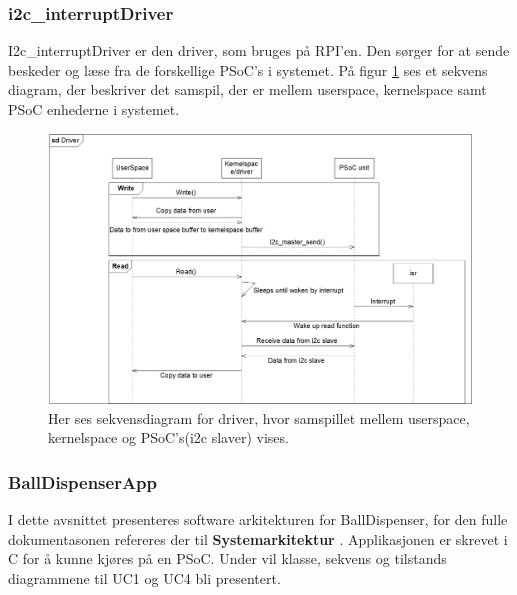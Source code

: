 \documentclass[Rapport/Rapport_main.tex]{subfiles}
\begin{document}
\subsubsection{i2c\_interruptDriver}
I2c\_interruptDriver er den driver, som bruges på RPI'en. Den sørger for at sende beskeder og læse fra de forskellige PSoC's i systemet. På figur \ref{fig:driver_sekvensdiagram} ses et sekvens diagram, der beskriver det samspil, der er mellem userspace, kernelspace samt PSoC enhederne i systemet. 
\begin{figure}[H]
    \centering
    \includegraphics[width=\textwidth]{Rapport/Arkitektur/graphics/driver_sekvensdiagram.png}
    \caption{Her ses sekvensdiagram for driver, hvor samspillet mellem userspace, kernelspace og PSoC's(i2c slaver) vises.}
    \label{fig:driver_sekvensdiagram}
\end{figure}





\subsubsection{BallDispenserApp}
I dette avsnittet presenteres software arkitekturen for BallDispenser, for den fulle dokumentasonen refereres der til \textbf{Systemarkitektur} . Applikasjonen er skrevet i C for å kunne kjøres på en PSoC. Under vil klasse, sekvens og tilstands diagrammene til UC1 og UC4 bli presentert.\\\\
\end{document}
